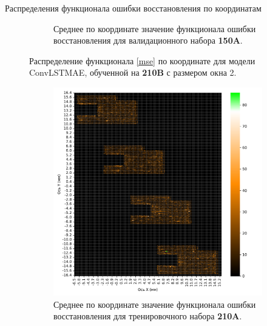 \documentclass{article}
\begin{document}
\begin{subsection}{Распределения функционала ошибки восстановления по координатам \label{app:distrs}}
\begin{figure}[H]
\begin{subfigure}{.47\textwidth}
            \caption{Среднее по координате значение функционала ошибки восстановления для валидационного набора \textbf{150A}.}\label{lstm_2_window_xy_test}
        \end{subfigure}
        \caption{Распределение функционала \eqref{mse} по координате для модели ConvLSTMAE, обученной на \textbf{210B} с размером окна 2.}\label{lstm_xy_2}
    \end{figure}

    \begin{figure}[H]
        \centering
        \begin{subfigure}{.47\textwidth}
            \centering
            \includegraphics[scale=.3]{lstm_2_window_xy_train.pdf}
            \caption{Среднее по координате значение функционала ошибки восстановления для тренировочного набора \textbf{210A}.}\label{lstm_2_window_xy_train}
        \end{subfigure}
        \hfill
        \begin{subfigure}{.47\textwidth}
            \centering

\end{subfigure}
\end{figure}
\end{subsection}
\end{document}
